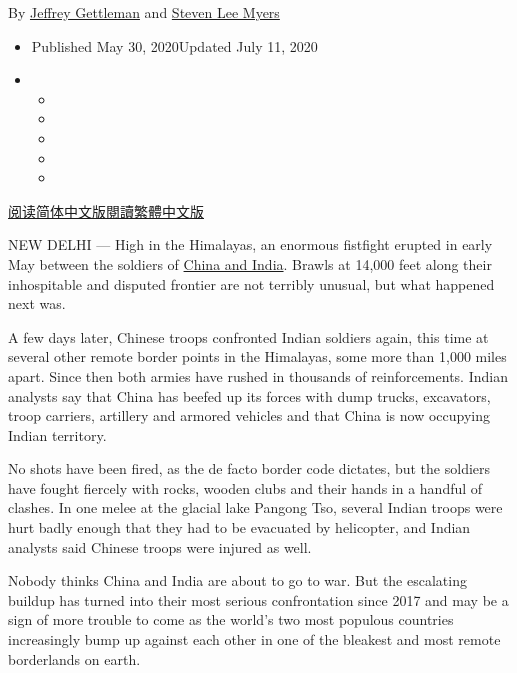 By \href{https://www.nytimes.com/by/jeffrey-gettleman}{Jeffrey
Gettleman} and \href{https://www.nytimes.com/by/steven-lee-myers}{Steven
Lee Myers}

\begin{itemize}
\item
  Published May 30, 2020Updated July 11, 2020
\item
  \begin{itemize}
  \item
  \item
  \item
  \item
  \item
  \end{itemize}
\end{itemize}

\href{https://cn.nytimes.com/world/20200603/india-china-border/}{阅读简体中文版}\href{https://cn.nytimes.com/world/20200603/india-china-border/zh-hant}{閱讀繁體中文版}

NEW DELHI --- High in the Himalayas, an enormous fistfight erupted in
early May between the soldiers of
\href{https://www.nytimes.com/2020/06/18/world/asia/india-china-border.html}{China
and India}. Brawls at 14,000 feet along their inhospitable and disputed
frontier are not terribly unusual, but what happened next was.

A few days later, Chinese troops confronted Indian soldiers again, this
time at several other remote border points in the Himalayas, some more
than 1,000 miles apart. Since then both armies have rushed in thousands
of reinforcements. Indian analysts say that China has beefed up its
forces with dump trucks, excavators, troop carriers, artillery and
armored vehicles and that China is now occupying Indian territory.

No shots have been fired, as the de facto border code dictates, but the
soldiers have fought fiercely with rocks, wooden clubs and their hands
in a handful of clashes. In one melee at the glacial lake Pangong Tso,
several Indian troops were hurt badly enough that they had to be
evacuated by helicopter, and Indian analysts said Chinese troops were
injured as well.

Nobody thinks China and India are about to go to war. But the escalating
buildup has turned into their most serious confrontation since 2017 and
may be a sign of more trouble to come as the world's two most populous
countries increasingly bump up against each other in one of the bleakest
and most remote borderlands on earth.

